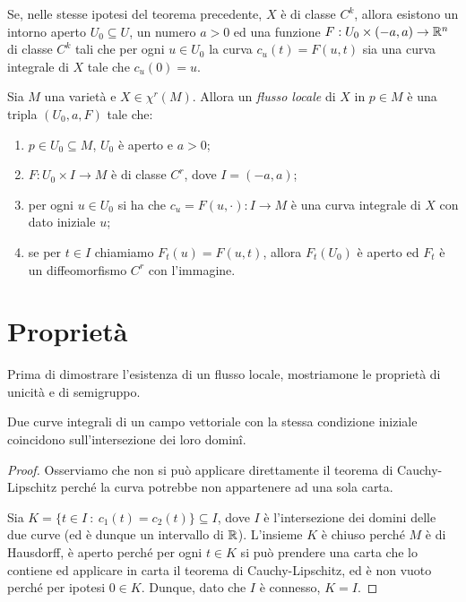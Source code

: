 \begin{theorem} 
	Se, nelle stesse ipotesi del teorema precedente, $X$ è di classe $C^k$, allora esistono un intorno aperto $U_0\subseteq U$, un numero $a>0$ ed una funzione $F:U_0\times (-a,a)\to\mathbb R^n$ di classe $C^k$ tali che per ogni $u\in U_0$ la curva $c_u(t)=F(u,t)$ sia una curva integrale di $X$ tale che $c_u(0)=u$.
\end{theorem}

\begin{definition}\label{def:FlussoLocale} 
	Sia $M$ una varietà e $X\in\chi^r(M)$. Allora un \emph{flusso locale} di $X$ in $p\in M$ è una tripla $(U_0,a,F)$ tale che:
	\begin{enumerate}
	\item $p\in U_0\subseteq M$, $U_0$ è aperto e $a>0$; \label{FL:aperto}
	\item $F:U_0\times I\to M$ è di classe $C^r$, dove $I=(-a,a)$; \label{FL:Cr}
	\item per ogni $u\in U_0$ si ha che $c_u=F(u,\cdot):I\to M$ è una curva integrale di $X$ con dato iniziale $u$; \label{FL:curvaintegrale}
	\item se per $t\in I$ chiamiamo $F_t(u)=F(u,t)$, allora $F_t(U_0)$ è aperto ed $F_t$ è un diffeomorfismo $C^r$ con l'immagine. \label{FL:diffeo}
	\end{enumerate}
\end{definition}

\section{Proprietà}

Prima di dimostrare l'esistenza di un flusso locale, mostriamone le proprietà di unicità e di semigruppo.
 
\begin{proposition} \label{prop:UnicitaCurveIntegrali}
	Due curve integrali di un campo vettoriale con la stessa condizione iniziale coincidono sull'intersezione dei loro dominî.
\end{proposition}

\begin{proof}
	Osserviamo che non si può applicare direttamente il teorema di Cauchy-Lipschitz perché la curva potrebbe non appartenere ad una sola carta.
	
	Sia $K=\{ t\in I\ : \ c_1(t)=c_2(t)\}\subseteq I$, dove $I$ è l'intersezione dei domini delle due curve (ed è dunque un intervallo di $\mathbb R$). L'insieme $K$ è chiuso perché $M$ è di Hausdorff, è aperto perché per ogni $t\in K$ si può prendere una carta che lo contiene ed applicare in carta il teorema di Cauchy-Lipschitz, ed è non vuoto perché per ipotesi $0\in K$. Dunque, dato che $I$ è connesso, $K=I$.
\end{proof}

